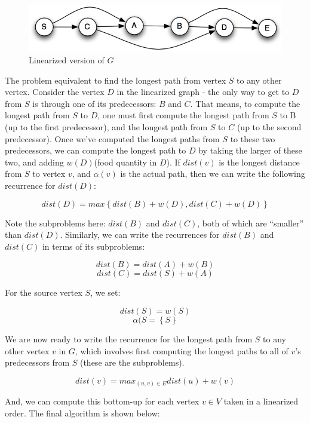 \begin{figure}[h]
\centering
\includegraphics[scale=0.4]{lineardag}
\caption{Linearized version of $G$}
\label{fig:p2}
\end{figure}

The problem equivalent to find the longest path from vertex $S$ to any other vertex. Consider the vertex $D$ in the linearized graph - the only way to get to $D$ from $S$ is through one of its predecessors: $B$ and $C$. That means, to compute the longest path from $S$ to $D$, one must first compute the longest path from $S$ to B (up to the first predecessor), and the longest path from $S$ to $C$ (up to the second predecessor). Once we've computed the longest paths from $S$ to these two predecessors, we can compute the longest path to $D$ by taking the larger of these two, and adding $w(D)$(food quantity in $D$). If $dist(v)$ is the longest distance from $S$ to vertex $v$, and $\alpha(v)$ is the actual path, then we can write the following recurrence for $dist(D)$:

$$ dist(D) = max\left\{ dist(B) + w(D), dist(C) + w(D) \right\} $$

Note the subproblems here: $dist(B)$ and $dist(C)$, both of which are “smaller” than $dist(D)$. Similarly, we can write the recurrences for $dist(B)$ and $dist(C)$ in terms of its subproblems:

$$ dist(B) = dist(A) + w(B) $$
$$ dist(C) = dist(S) + w(A) $$

For the source vertex $S$, we set:

$$ dist(S) = w(S) $$
$$ \alpha(S = \left\{ S \right\} $$

We are now ready to write the recurrence for the longest path from $S$ to any other vertex $v$ in $G$, which involves first computing the longest paths to all of $v$'s predecessors from $S$ (these are the subproblems).

$$ dist(v) = max_{(u, v) \in E}{dist(u) + w(v)} $$

And, we can compute this bottom-up for each vertex $v \in V$ taken in a linearized order. The final algorithm is shown below:\\


